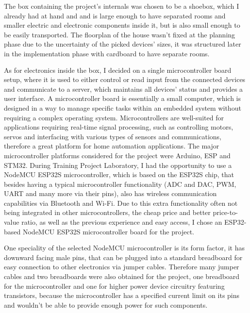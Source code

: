 The box containing the project's internals was chosen to be a shoebox, which I already had at hand and and is large enough to have separated rooms and smaller electric and electronic components inside it, but is also small enough to be easily transported. The floorplan of the house wasn't fixed at the planning phase due to the uncertainty of the picked devices' sizes, it was structured later in the implementation phase with cardboard to have separate rooms.

As for electronics inside the box, I decided on a single microcontroller board setup, where it is used to either control or read input from the connected devices and communicate to a server, which maintains all devices' status and provides a user interface. A microcontroller board is essentially a small computer, which is designed in a way to manage specific tasks within an embedded system without requiring a complex operating system. \cite{IBMmicrocontroller} Microcontrollers are well-suited for applications requiring real-time signal processing, such as controlling motors, servos and interfacing with various types of sensors and communications, therefore a great platform for home automation applications. The major microcontroller platforms considered for the project were Arduino, ESP and STM32. During Training Project Laboratory, I had the opportunity to use a NodeMCU ESP32S microcontroller, which is based on the ESP32S chip, that besides having a typical microcontroller functionality (ADC and DAC, PWM, UART and many more via their pins), also has wireless communication capabilities via Bluetooth and Wi-Fi. Due to this extra functionality often not being integrated in other microcontrollers, the cheap price and better price-to-value ratio, as well as the previous experience and easy access, I chose an ESP32-based NodeMCU ESP32S microcontroller board for the project. \cite{ESPvArduino} \cite{ESPvSTM}

One speciality of the selected NodeMCU microcontroller is its form factor, it has downward facing male pins, that can be plugged into a standard breadboard for easy connection to other electronics via jumper cables. Therefore many jumper cables and two breadboards were also obtained for the project, one breadboard for the microcontroller and one for higher power device circuitry featuring transistors, because the microcontroller has a specified current limit on its pins and wouldn't be able to provide enough power for such components.

